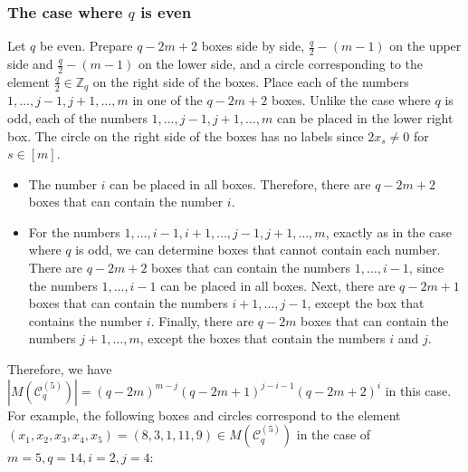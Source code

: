 \documentclass{article}
\theoremstyle{plain}
\theoremstyle{definition}
\theoremstyle{remark}
\numberwithin{equation}{section}
\newcommand{\Cc}{\mathcal{C}}
\begin{document}
\subsubsection{The case where $q$ is even}\label{sec-TypeC-rest-x_i=-x_j-even}
Let $q$ be even.
Prepare $q-2m+2$ boxes side by side, $\displaystyle \frac{q}{2}-(m-1)$ on the upper side and $\displaystyle \frac{q}{2}-(m-1)$ on the lower side, and a circle corresponding to the element $\displaystyle \frac{q}{2}\in\mathbb{Z}_q$ on the right side of the boxes.
Place each of the numbers $1,\dots,j-1,j+1,\dots,m$ in one of the $q-2m+2$ boxes.
Unlike the case where $q$ is odd, each of the numbers $1,\dots,j-1,j+1,\dots,m$ can be placed in the lower right box.
The circle on the right side of the boxes has no labels since $2x_s\neq 0$ for $s\in [m]$.
\begin{itemize}
\item The number $i$ can be placed in all boxes.
Therefore, there are $q-2m+2$ boxes that can contain the number $i$.
\item For the numbers $1,\dots,i-1,i+1,\dots,j-1,j+1,\dots,m$, exactly as in the case where $q$ is odd, we can determine boxes that cannot contain each number.
There are $q-2m+2$ boxes that can contain the numbers $1,\dots,i-1$, since the numbers $1,\dots,i-1$ can be placed in all boxes.
Next, there are $q-2m+1$ boxes that can contain the numbers $i+1,\dots,j-1$, except the box that contains the number $i$.
Finally, there are $q-2m$ boxes that can contain the numbers $j+1,\dots,m$, except the boxes that contain the numbers $i$ and $j$.
\end{itemize}
Therefore, we have $|M(\Cc^{(5)}_q)|=(q-2m)^{m-j}(q-2m+1)^{j-i-1}(q-2m+2)^{i}$ in this case.
For example, the following boxes and circles correspond to the element $(x_1,x_2,x_3,x_4,x_5)=(8,3,1,11,9)\in M(\Cc^{(5)}_q)$ in the case of $m=5,q=14,i=2,j=4$:
\begin{center}
\end{center}
\end{document}
